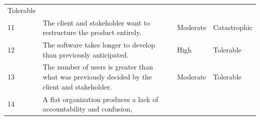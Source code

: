 \documentclass[]{article}
\begin{document}
\begin{longtable}[c]{@{}llll@{}}
\begin{minipage}[t]{0.22\columnwidth}
Tolerable
\end{minipage}
\\\addlinespace
\begin{minipage}[t]{0.22\columnwidth}\raggedright
11
\end{minipage} & \begin{minipage}[t]{0.22\columnwidth}\raggedright
The client and stakeholder want to restructure the product entirely.
\end{minipage} & \begin{minipage}[t]{0.22\columnwidth}\raggedright
Moderate
\end{minipage} & \begin{minipage}[t]{0.22\columnwidth}\raggedright
Catastrophic
\end{minipage}
\\\addlinespace
\begin{minipage}[t]{0.22\columnwidth}\raggedright
12
\end{minipage} & \begin{minipage}[t]{0.22\columnwidth}\raggedright
The software takes longer to develop than previously anticipated.
\end{minipage} & \begin{minipage}[t]{0.22\columnwidth}\raggedright
High
\end{minipage} & \begin{minipage}[t]{0.22\columnwidth}\raggedright
Tolerable
\end{minipage}
\\\addlinespace
\begin{minipage}[t]{0.22\columnwidth}\raggedright
13
\end{minipage} & \begin{minipage}[t]{0.22\columnwidth}\raggedright
The number of users is greater than what was previously decided by the
client and stakeholder.
\end{minipage} & \begin{minipage}[t]{0.22\columnwidth}\raggedright
Moderate
\end{minipage} & \begin{minipage}[t]{0.22\columnwidth}\raggedright
Tolerable
\end{minipage}
\\\addlinespace
\begin{minipage}[t]{0.22\columnwidth}\raggedright
14
\end{minipage} & \begin{minipage}[t]{0.22\columnwidth}\raggedright
A flat organization produces a lack of accountability and confusion,

\end{minipage}
\end{longtable}
\end{document}
